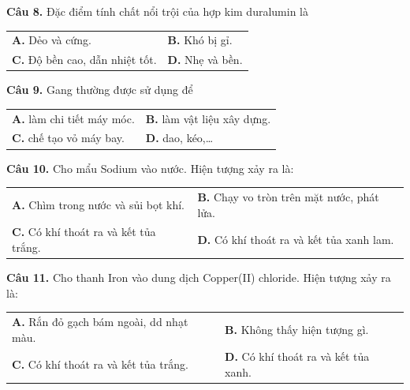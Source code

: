\documentclass{article}
\begin{document}
\vspace*{\fill}

\textbf{Câu 8.} Đặc điểm tính chất nổi trội của hợp kim duralumin là
\vspace{6pt}

\begin{tabularx}{\linewidth}{@{}X X@{}}
\textbf{A.} Dẻo và cứng. & \textbf{B.} Khó bị gỉ.\\[8pt]
\textbf{C.} Độ bền cao, dẫn nhiệt tốt. & \textbf{D.} Nhẹ và bền.
\end{tabularx}
\vspace*{\fill}
\newpage

\fontsize{28}{36}\selectfont
\textbf{Câu 9.} Gang thường được sử dụng để
\vspace{6pt}

\begin{tabularx}{\linewidth}{@{}X X@{}}
\textbf{A.} làm chi tiết máy móc. & \textbf{B.} làm vật liệu xây dựng.\\[8pt]
\textbf{C.} chế tạo vỏ máy bay. & \textbf{D.} dao, kéo,\dots
\end{tabularx}

\vspace*{\fill}

\textbf{Câu 10.} Cho mẩu Sodium vào nước. Hiện tượng xảy ra là:
\vspace{6pt}

\begin{tabularx}{\linewidth}{@{}X X@{}}
\textbf{A.} Chìm trong nước và sủi bọt khí. & \textbf{B.} Chạy vo tròn trên mặt nước, phát lửa.\\[8pt]
\textbf{C.} Có khí thoát ra và kết tủa trắng. & \textbf{D.} Có khí thoát ra và kết tủa xanh lam.
\end{tabularx}
\vspace*{\fill}
\newpage

\fontsize{28}{36}\selectfont
\textbf{Câu 11.} Cho thanh Iron vào dung dịch Copper(II) chloride. Hiện tượng xảy ra là:
\vspace{6pt}

\begin{tabularx}{\linewidth}{@{}X X@{}}
\textbf{A.} Rắn đỏ gạch bám ngoài, dd nhạt màu. & \textbf{B.} Không thấy hiện tượng gì.\\[8pt]
\textbf{C.} Có khí thoát ra và kết tủa trắng. & \textbf{D.} Có khí thoát ra và kết tủa xanh.
\end{tabularx}
\end{document}
